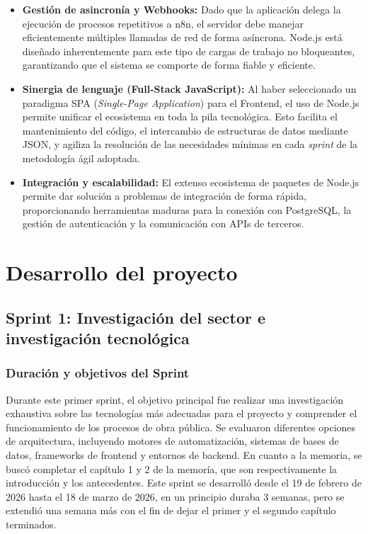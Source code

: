 \documentclass[12pt, a4paper]{book}
\begin{document}
\begin{itemize}
    \item \textbf{Gestión de asincronía y Webhooks:} Dado que la aplicación delega la ejecución de procesos repetitivos a n8n, el servidor debe manejar eficientemente múltiples llamadas de red de forma asíncrona. Node.js está diseñado inherentemente para este tipo de cargas de trabajo no bloqueantes, garantizando que el sistema se comporte de forma fiable y eficiente.
    \item \textbf{Sinergia de lenguaje (Full-Stack JavaScript):} Al haber seleccionado un paradigma SPA (\textit{Single-Page Application}) para el Frontend, el uso de Node.js permite unificar el ecosistema en toda la pila tecnológica. Esto facilita el mantenimiento del código, el intercambio de estructuras de datos mediante JSON, y agiliza la resolución de las necesidades mínimas en cada \textit{sprint} de la metodología ágil adoptada.
    \item \textbf{Integración y escalabilidad:} El extenso ecosistema de paquetes de Node.js permite dar solución a problemas de integración de forma rápida, proporcionando herramientas maduras para la conexión con PostgreSQL, la gestión de autenticación y la comunicación con APIs de terceros.
\end{itemize}
\cleardoublepage
\thispagestyle{empty}
\chapter{Desarrollo del proyecto}
\section{Sprint 1: Investigación del sector e investigación tecnológica}
\subsection{Duración y objetivos del Sprint}
Durante este primer sprint, el objetivo principal fue realizar una investigación exhaustiva sobre las tecnologías más adecuadas para el proyecto y comprender el funcionamiento de los procesos de obra pública. Se evaluaron diferentes opciones de arquitectura, incluyendo motores de automatización, sistemas de bases de datos, frameworks de frontend y entornos de backend. En cuanto a la memoria, se buscó completar el capítulo 1 y 2 de la memoría, que son respectivamente la introducción y los antecedentes.
Este sprint se desarrolló desde el 19 de febrero de 2026 hasta el 18 de marzo de 2026, en un principio duraba 3 semanas, pero se extendió una semana más con el fin de dejar el primer y el segundo capítulo terminados.
\end{document}
